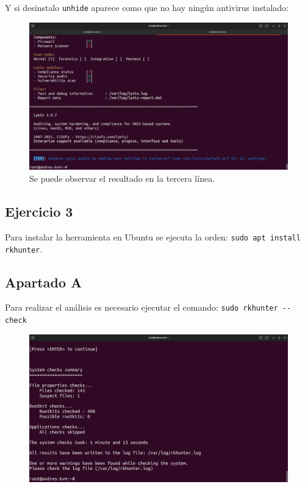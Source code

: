 \documentclass{article}
\begin{document}
Y si desinstalo \verb|unhide| aparece como que no hay ningún antivirus instalado:

\begin{figure}[H]
    \includegraphics[width=\textwidth]{imagenes/lynisnook.png}
    \caption{Se puede observar el resultado en la tercera línea.}
\end{figure}


\subsection*{Ejercicio 3}

Para instalar la herramienta en Ubuntu se ejecuta la orden: \verb|sudo apt install rkhunter|.

\subsection*{Apartado A}
Para realizar el análisis es necesario ejecutar el comando: \verb|sudo rkhunter --check|

\begin{figure}[H]
    \includegraphics[width=\textwidth]{imagenes/rkhuntersalida1.png}
\end{figure}
\end{document}
